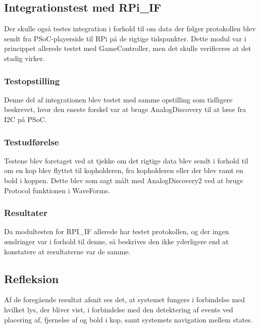 \documentclass[Integrationstest/Integrationstest_main.tex]{subfiles}
\begin{document}
\subsection{Integrationstest med RPi\_IF}
Der skulle også testes integration i forhold til om  data der følger protokollen blev sendt fra PSoC-playerside til RPi på de rigtige tidspunkter. Dette modul var i princippet allerede testet med GameController, men det skulle verificeres at det stadig virker.

\subsubsection{Testopstilling}
Denne del af integrationen blev testet med samme opstilling som tidligere beskrevet, hvor den eneste forskel var at bruge AnalogDiscovery til at læse fra I2C på PSoC.

\subsubsection{Testudførelse}
Testene blev foretaget ved at tjekke om det rigtige data blev sendt i forhold til om en kop blev flyttet til kopholderen, fra kopholderen eller der blev ramt en bold i koppen. Dette blev som sagt målt med AnalogDiscovery2 ved at bruge Protocol funktionen i WaveForms.

\subsubsection{Resultater}
Da modultesten for RPI\_IF allerede har testet protokollen, og der ingen ændringer var i forhold til denne, så beskrives den ikke yderligere end at konstatere at resultaterne var de samme.


\subsection{Refleksion}
Af de foregående resultat afsnit ses det, at systemet fungere i forbindelse med hvilket lys, der bliver vist, i forbindelse med den detektering af events  ved placering af, fjernelse af og bold i kop, samt systemets navigation mellem states.
\end{document}
